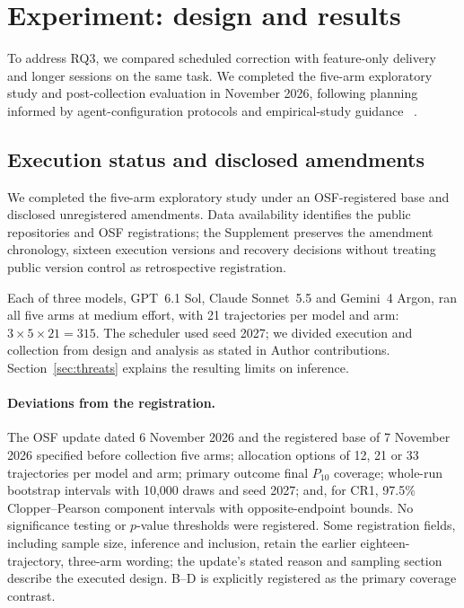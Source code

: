 \section{Experiment: design and results}\label{sec:experiment}

To address RQ3, we compared scheduled correction with feature-only delivery
and longer sessions on the same task. We completed the five-arm exploratory study and post-collection evaluation in November 2026, following planning informed by
agent-configuration protocols and empirical-study guidance
~\cite{lulla2026protocol,baltes2026guidelines,wohlin2012experimentation}.

\subsection{Execution status and disclosed amendments}\label{sec:studyexecution}

We completed the five-arm exploratory study under an OSF-registered base
and disclosed unregistered amendments. Data availability identifies the public
repositories and OSF registrations; the Supplement preserves the amendment chronology,
sixteen execution versions and recovery decisions without treating public
version control as retrospective registration.

Each of three models, GPT~6.1 Sol, Claude Sonnet~5.5 and Gemini~4 Argon,
ran all five arms at medium effort, with 21 trajectories per model and arm:
$3\times5\times21=315$. The scheduler used seed 2027; we divided execution and collection from design and analysis as stated in Author contributions. Section~\ref{sec:threats} explains the resulting
limits on inference.

\paragraph{Deviations from the registration.}
The OSF update dated 6 November 2026 and the registered base of
7 November 2026 specified before collection five arms; allocation options
of 12, 21 or 33 trajectories per model and arm; primary outcome final
$P_{10}$ coverage; whole-run bootstrap intervals with 10,000 draws and
seed 2027; and, for CR1, 97.5\% Clopper--Pearson component intervals
with opposite-endpoint bounds. No significance testing or $p$-value
thresholds were registered.
Some registration fields, including sample size, inference and inclusion,
retain the earlier eighteen-trajectory, three-arm wording; the update's
stated reason and sampling section describe the executed design.
B--D is explicitly registered as the primary coverage contrast.

